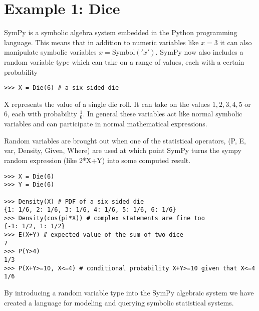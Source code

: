 \section{Example 1: Dice}

SymPy is a symbolic algebra system embedded in the Python programming language. This means that in addition to numeric variables like $x = 3$ it can also manipulate symbolic variables $ x = $Symbol$('x')$.
SymPy now also includes a random variable type which can take on a range of values, each with a certain probability 

\begin{lstlisting}
>>> X = Die(6) # a six sided die
\end{lstlisting}

X represents the value of a single die roll. It can take on the values $1,2,3,4,5$ or $6$, each with probability $\frac{1}{6}$. In general these variables act like normal symbolic variables and can participate in normal mathematical expressions. 

Random variables are brought out when one of the statistical operators, (P, E, var, Density, Given, Where) are used at which point SymPy turns the sympy random expression (like 2*X+Y) into some computed result. 

\begin{lstlisting}
>>> X = Die(6)
>>> Y = Die(6)

>>> Density(X) # PDF of a six sided die
{1: 1/6, 2: 1/6, 3: 1/6, 4: 1/6, 5: 1/6, 6: 1/6}
>>> Density(cos(pi*X)) # complex statements are fine too
{-1: 1/2, 1: 1/2}
>>> E(X+Y) # expected value of the sum of two dice
7
>>> P(Y>4) 
1/3
>>> P(X+Y>=10, X<=4) # conditional probability X+Y>=10 given that X<=4
1/6
\end{lstlisting}

By introducing a random variable type into the SymPy algebraic system we have created a language for modeling and querying symbolic statistical systems. 
